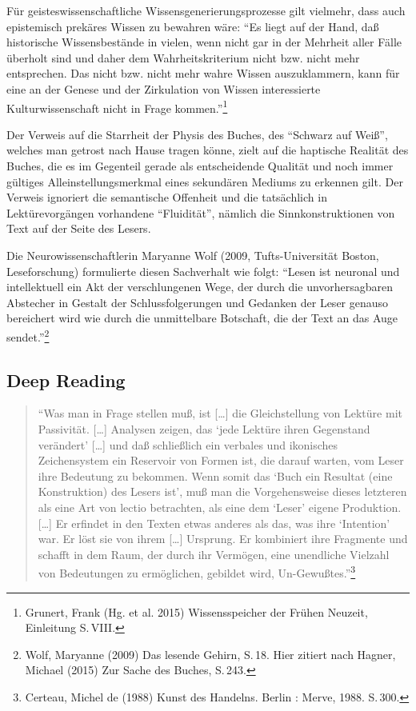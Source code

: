 \documentclass[a4paper,
fontsize=11pt,
oneside,
numbers=noperiodatend,
parskip=half-,
bibliography=totoc,
final
]{scrartcl}
\begin{document}
Für geisteswissenschaftliche Wissensgenerierungsprozesse gilt vielmehr,
dass auch epistemisch prekäres Wissen zu bewahren wäre: \enquote{Es
liegt auf der Hand, daß historische Wissensbestände in vielen, wenn
nicht gar in der Mehrheit aller Fälle überholt sind und daher dem
Wahrheitskriterium nicht bzw. nicht mehr entsprechen. Das nicht bzw.
nicht mehr wahre Wissen auszuklammern, kann für eine an der Genese und
der Zirkulation von Wissen interessierte Kulturwissenschaft nicht in
Frage kommen.}\footnote{Grunert, Frank (Hg. et al. 2015) Wissensspeicher
  der Frühen Neuzeit, Einleitung S.\,VIII.}

Der Verweis auf die Starrheit der Physis des Buches, des
\enquote{Schwarz auf Weiß}, welches man getrost nach Hause tragen könne,
zielt auf die haptische Realität des Buches, die es im Gegenteil gerade
als entscheidende Qualität und noch immer gültiges
Alleinstellungsmerkmal eines sekundären Mediums zu erkennen gilt. Der
Verweis ignoriert die semantische Offenheit und die tatsächlich in
Lektürevorgängen vorhandene \enquote{Fluidität}, nämlich die
Sinnkonstruktionen von Text auf der Seite des Lesers.

Die Neurowissenschaftlerin Maryanne Wolf (2009, Tufts-Universität
Boston, Leseforschung) formulierte diesen Sachverhalt wie folgt:
\enquote{Lesen ist neuronal und intellektuell ein Akt der verschlungenen
Wege, der durch die unvorhersagbaren Abstecher in Gestalt der
Schlussfolgerungen und Gedanken der Leser genauso bereichert wird wie
durch die unmittelbare Botschaft, die der Text an das Auge
sendet.}\footnote{Wolf, Maryanne (2009) Das lesende Gehirn, S.\,18. Hier
  zitiert nach Hagner, Michael (2015) Zur Sache des Buches, S.\,243.}

\subsection*{Deep Reading}\label{deep-reading}

\begin{quote}
\enquote{Was man in Frage stellen muß, ist {[}\ldots{}{]} die
Gleichstellung von Lektüre mit Passivität. {[}\ldots{}{]} Analysen
zeigen, das \enquote{jede Lektüre ihren Gegenstand verändert}
{[}\ldots{}{]} und daß schließlich ein verbales und ikonisches
Zeichensystem ein Reservoir von Formen ist, die darauf warten, vom Leser
ihre Bedeutung zu bekommen. Wenn somit das \enquote{Buch ein Resultat
(eine Konstruktion) des Lesers ist}, muß man die Vorgehensweise dieses
letzteren als eine Art von lectio betrachten, als eine dem
\enquote{Leser} eigene Produktion. {[}\ldots{}{]} Er erfindet in den
Texten etwas anderes als das, was ihre \enquote{Intention} war. Er löst
sie von ihrem {[}\ldots{}{]} Ursprung. Er kombiniert ihre Fragmente und
schafft in dem Raum, der durch ihr Vermögen, eine unendliche Vielzahl
von Bedeutungen zu ermöglichen, gebildet wird, Un-Gewußtes.}\footnote{Certeau,
  Michel de (1988) Kunst des Handelns. Berlin : Merve, 1988. S.\,300.}
\end{quote}
\end{document}
